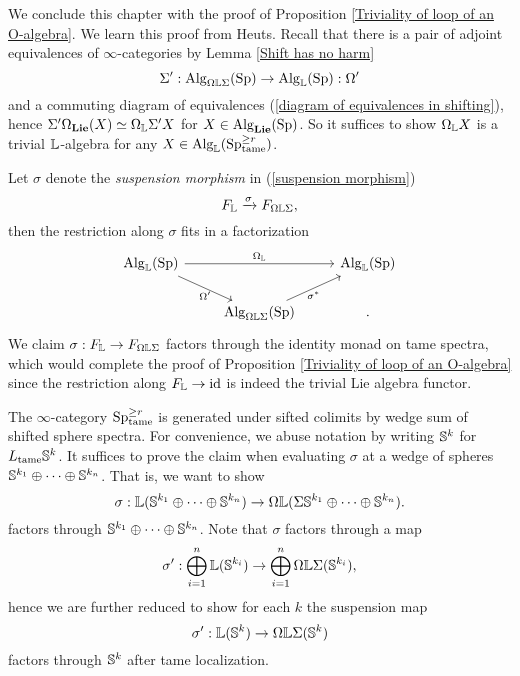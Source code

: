 We conclude this chapter with the proof of Proposition \ref{Triviality of loop of an O-algebra}.
We learn this proof from Heuts. 
Recall that there is a pair of adjoint equivalences of $\infty$-categories by Lemma \ref{Shift has no harm} 
$$
\Sigma': \operatorname{Alg}_{\Omega {\mathbb{L}} \Sigma}(\operatorname{Sp})  \to \operatorname{Alg}_{{\mathbb{L}}}(\operatorname{Sp}): \Omega'
$$
and a commuting diagram of equivalences  (\ref{diagram of equivalences in shifting}),
hence $\Sigma' \Omega_{\mathbf{Lie}}(X)\simeq \Omega_{{\mathbb{L}}}\Sigma'X$ for $X\in \operatorname{Alg}_{\mathbf{Lie}}(\operatorname{Sp})$.
So it suffices to show $\Omega_{{\mathbb{L}}} X$ is a trivial ${\mathbb{L}}$-algebra for any $X\in \operatorname{Alg}_{{\mathbb{L}}}(\operatorname{Sp}^{\geq r}_{\operatorname{\operatorname{tame}}})$.

Let $\sigma$ denote the \emph{suspension morphism} in (\ref{suspension morphism})
\[
F_{{\mathbb{L}}} \xrightarrow{\sigma} F_{\Omega {\mathbb{L}} \Sigma},
\]
then the restriction along $\sigma$ fits in a factorization
\[
\begin{tikzcd}
	\Alg_{\BL}(\Sp) &   & \Alg_{\BL}(\Sp) \\
	&  \Alg_{\Omega \BL \Sigma}(\Sp) &
	\arrow[from=1-1, to = 1-3, "\Omega_{\BL}"]
	\arrow[from=1-1 , to =2-2, "\Omega'" below]
	\arrow[from=2-2, to=1-3, "\sigma^*" below].
\end{tikzcd}
\]
We claim $\sigma:F_{{\mathbb{L}}}\to F_{\Omega {\mathbb{L}} \Sigma}$ factors through the identity monad on tame spectra, which would complete the proof of Proposition \ref{Triviality of loop of an O-algebra}
since the restriction along $F_{\mathbb{L}} \to \operatorname{id}$ is indeed the trivial Lie algebra functor. 

The $\infty$-category $\operatorname{Sp}^{\geq r}_{\operatorname{\operatorname{tame}}}$ is generated under sifted colimits by wedge sum of shifted sphere spectra.
For convenience, we abuse notation by writing ${\mathbb{S}}^k$ for $L_{\operatorname{\operatorname{tame}}}{\mathbb{S}}^k$.
 It suffices to prove the claim when evaluating $\sigma$ at a wedge of spheres 
${\mathbb{S}}^{k_1}\oplus \cdots \oplus {\mathbb{S}}^{k_n}$.
That is, we want to show 
$$
\sigma: 
{\mathbb{L}}({\mathbb{S}}^{k_1}\oplus \cdots \oplus {\mathbb{S}}^{k_n})
\to 
\Omega {\mathbb{L}} (\Sigma {\mathbb{S}}^{k_1}\oplus \cdots \oplus {\mathbb{S}}^{k_n}).
$$
factors through ${\mathbb{S}}^{k_1}\oplus \cdots \oplus {\mathbb{S}}^{k_n}$.
Note that $\sigma$ factors through a map
$$
\sigma':\bigoplus_{i=1}^{n} {\mathbb{L}}({\mathbb{S}}^{k_i}) \to 
\bigoplus_{i=1}^{n} \Omega{\mathbb{L}}\Sigma({\mathbb{S}}^{k_i}),
$$
hence we are further reduced to show for each $k$ the suspension map 
$$
\sigma':{\mathbb{L}}({\mathbb{S}}^{k}) \to 
\Omega{\mathbb{L}}\Sigma({\mathbb{S}}^{k})
$$
factors through ${\mathbb{S}}^{k}$ after tame localization.




